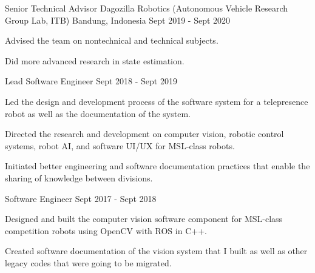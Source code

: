 \begin{cventries}
\cventry
{Senior Technical Advisor} %
{Dagozilla Robotics (Autonomous Vehicle Research Group Lab, ITB)} %
{Bandung, Indonesia} %
{Sept 2019 - Sept 2020} %
{
	\begin{cvitems} %
		\item {Advised the team on nontechnical and technical subjects.}
		\item {Did more advanced research in state estimation.}
	\end{cvitems}
}

\cventry
{Lead Software Engineer} %
{} %
{} %
{Sept 2018 - Sept 2019} %
{
	\begin{cvitems} %
		\item {Led the design and development process of the software system for a telepresence robot as well as the documentation of the system.}
		\item {Directed the research and development on computer vision, robotic control systems, robot AI, and software UI/UX for MSL-class robots.}
		\item {Initiated better engineering and software documentation practices that enable the sharing of knowledge between divisions.}
	\end{cvitems}
}

\cventry
{Software Engineer} %
{} %
{} %
{Sept 2017 - Sept 2018} %
{
	\begin{cvitems} %
		\item {Designed and built the computer vision software component for MSL-class competition robots using OpenCV with ROS in C++.}
		\item {Created software documentation of the vision system that I built as well as other legacy codes that were going to be migrated.}
	\end{cvitems}
}

\end{cventries}
